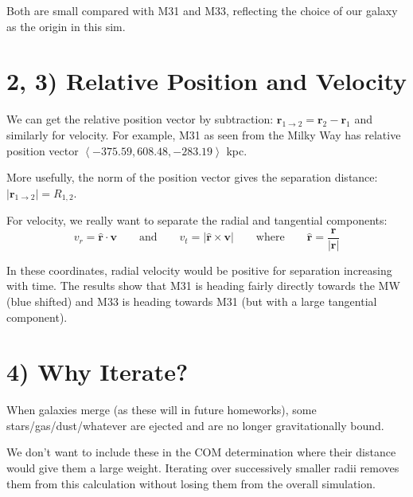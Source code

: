 Both are small compared with M31 and M33, reflecting the choice of our galaxy as the origin in this sim.

\section*{2, 3) Relative Position and Velocity}

We can get the relative position vector by subtraction: $\mathbf{r}_{1 \rightarrow 2} = \mathbf{r}_2 - \mathbf{r}_1$ and similarly for velocity. For example, M31 as seen from the Milky Way has relative position vector $\left< -375.59,  608.48, -283.19 \right>$ kpc.

More usefully, the norm of the position vector gives the separation distance: $|\mathbf{r}_{1 \rightarrow 2}| = R_{1,2}$. 

For velocity, we really want to separate the radial and tangential components:
\[ v_r = \mathbf{\hat{r}} \cdot \mathbf{v} \qquad \text{and} \qquad v_t = | \mathbf{\hat{r}} \times \mathbf{v} |  \qquad \text{where} \qquad \mathbf{\hat{r}} = \frac{\mathbf{r}}{|\mathbf{r}|} \]

{ \par}\vspace{5mm}

In these coordinates, radial velocity would be positive for separation increasing with time. The results show that M31 is heading fairly directly towards the MW (blue shifted) and M33 is heading towards M31 (but with a large tangential component).

\section*{4) Why Iterate?}

When galaxies merge (as these will in future homeworks), some stars/gas/dust/whatever are ejected and are no longer gravitationally bound. 

We don't want to include these in the COM determination where their distance would give them a large weight. Iterating over successively smaller radii removes them from this calculation without losing them from the overall simulation.


